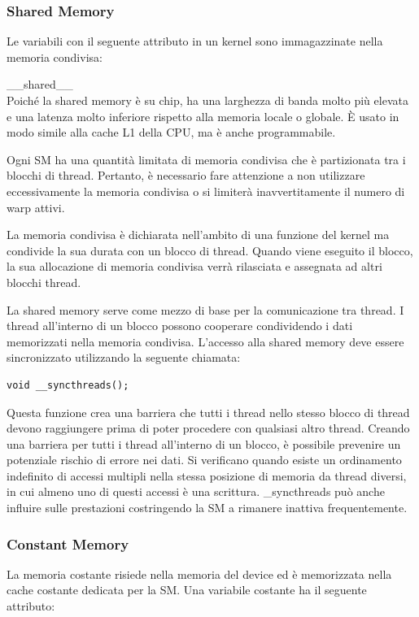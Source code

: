 \subsubsection{Shared Memory}
Le variabili con il seguente attributo in un kernel sono immagazzinate nella memoria condivisa:

\_\_shared\_\_ \\

Poiché la shared memory è su chip, ha una larghezza di banda molto più elevata e una latenza molto inferiore rispetto alla memoria locale o globale. È usato in modo simile alla cache L1 della CPU, ma è anche programmabile.

Ogni SM ha una quantità limitata di memoria condivisa che è partizionata tra i blocchi di thread. Pertanto, è necessario fare attenzione a non utilizzare eccessivamente la memoria condivisa o si limiterà inavvertitamente il numero di warp attivi.

La memoria condivisa è dichiarata nell'ambito di una funzione del kernel ma condivide la sua durata con un blocco di thread. Quando viene eseguito il blocco, la sua allocazione di memoria condivisa verrà rilasciata e assegnata ad altri blocchi thread.

La shared memory serve come mezzo di base per la comunicazione tra thread. I thread all'interno di un blocco possono cooperare condividendo i dati memorizzati nella memoria condivisa. L'accesso alla shared memory deve essere sincronizzato utilizzando la seguente chiamata:
\begin{lstlisting}[label=code:syncthreads_def]
void __syncthreads();
\end{lstlisting}
Questa funzione crea una barriera che tutti i thread nello stesso blocco di thread devono raggiungere prima di poter procedere con qualsiasi altro thread. Creando una barriera per tutti i thread all'interno di un blocco, è possibile prevenire un potenziale rischio di errore nei dati. Si verificano quando esiste un ordinamento indefinito di accessi multipli nella stessa posizione di memoria da thread diversi, in cui almeno uno di questi accessi è una scrittura. \_syncthreads può anche influire sulle prestazioni costringendo la SM a rimanere inattiva frequentemente.

\subsubsection{Constant Memory}
La memoria costante risiede nella memoria del device ed è memorizzata nella cache costante dedicata per la SM. Una variabile costante ha il seguente attributo:

